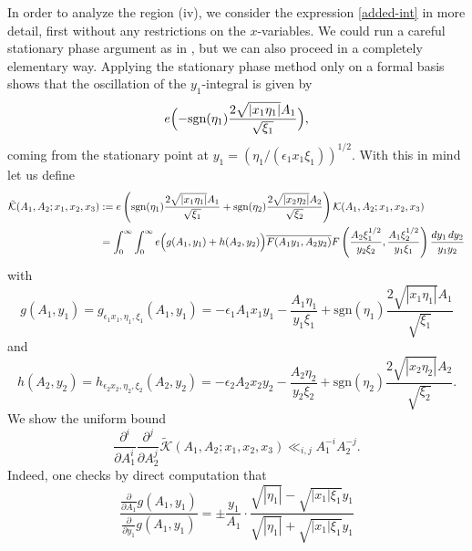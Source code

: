 \documentclass[11pt]{amsart}
\theoremstyle{plain}
\numberwithin{equation}{section}
\theoremstyle{definition}
\begin{document}
 In order to analyze the region (iv), we consider the expression \eqref{added-int} in more detail, first without any restrictions on the $x$-variables. We could run a careful stationary phase argument as in \cite[Proposition 8.2]{BKY}, but we can also proceed in a completely elementary way. Applying the stationary phase method only on a formal basis shows that the oscillation of the $y_1$-integral is given by $$e\Bigl(- \text{sgn}(\eta_1) \frac{2 \sqrt{|x_1\eta_1|} A_1}{\sqrt{\xi_1}}\Bigr), $$
coming from the stationary point at $y_1 = (\eta_1/(\epsilon_1 x_1\xi_1))^{1/2}$. 
With this in mind let us define  
\begin{displaymath}
\begin{split}
\tilde{\mathcal{K}}(A_1, A_2; x_1, x_2, x_3) & := e\left( \text{sgn}(\eta_1)   \frac{2 \sqrt{|x_1\eta_1|} A_1}{\sqrt{\xi_1}}+ \text{sgn}(\eta_2)  \frac{2 \sqrt{|x_2\eta_2|} A_2}{\sqrt{\xi_2}}\right)\mathcal{K}(A_1, A_2; x_1, x_2, x_3)\\
& = 
  \int_0^{\infty}\int_0^{\infty}   e\Bigl(g(A_1, y_1) + h(A_2, y_2)\Bigr)
  \overline{F(A_1y_1, A_2 y_2)}   F\left(\frac{A_2\xi_1^{1/2}}{y_2\xi_2} , \frac{A_1\xi_2^{1/2}}{y_1\xi_1}  \right)   \frac{dy_1\, dy_2}{y_1y_2}
\end{split}
\end{displaymath}
with
$$g(A_1, y_1) = g_{\epsilon_1 x_1, \eta_1, \xi_1}(A_1, y_1) =  - \epsilon_1 A_1x_1y_1 - \frac{A_1\eta_1}{y_1\xi_1} +  \text{sgn}(\eta_1) \frac{ 2\sqrt{|x_1\eta_1|}A_1  }{\sqrt{\xi_1}}$$
and
$$h(A_2, y_2) = h_{\epsilon_2 x_2, \eta_2, \xi_2}(A_2, y_2) =  - \epsilon_2 A_2x_2y_2 - \frac{A_2\eta_2}{y_2\xi_2} +  \text{sgn}(\eta_2) \frac{ 2\sqrt{|x_2\eta_2|}A_2 }{\sqrt{\xi_2}}.$$
We show the uniform bound 
\begin{equation}\label{eq-in-lemma4}\frac{\partial^i}{\partial A_1^i}  \frac{\partial^j}{\partial A_2^j}\tilde{\mathcal{K}}(A_1, A_2; x_1, x_2, x_3) \ll_{i, j} A_1^{-i}A_2^{-j}. 
\end{equation}
Indeed, one checks by direct computation that
$$  \frac{\frac{\partial}{\partial A_1} g(A_1, y_1)}{\frac{\partial}{\partial y_1} g(A_1, y_1)}   = \pm %
\frac{y_1}{A_1} \cdot  \frac{\sqrt{|\eta_1|} - \sqrt{|x_1|\xi_1}y_1}{\sqrt{|\eta_1|} + \sqrt{|x_1|\xi_1}y_1} $$%
\end{document}
